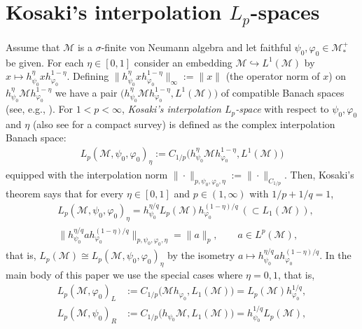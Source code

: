 \documentclass[12pt]{article}
\theoremstyle{definition}
\theoremstyle{remark}
\numberwithin{equation}{section}
\def\Me{\mathcal M}
\def\ffi{\varphi}
\begin{document}
\section{Kosaki's interpolation $L_p$-spaces}\label{Appen-Kosaki-Lp}

Assume that $\Me$ is a $\sigma$-finite von Neumann algebra and let faithful
$\psi_0,\ffi_0\in\Me_*^+$ be given. For each $\eta\in[0,1]$ consider an embedding
$\Me\hookrightarrow L^1(\Me)$ by $x\mapsto h_{\psi_0}^\eta xh_{\ffi_0}^{1-\eta}$. Defining
$\|h_{\psi_0}^\eta xh_{\ffi_0}^{1-\eta}\|_\infty:=\|x\|$ (the operator norm of $x$) on
$h_{\psi_0}^\eta\Me h_{\ffi_0}^{1-\eta}$ we have a pair
$\bigl(h_{\psi_0}^\eta\Me h_{\ffi_0}^{1-\eta},L^1(\Me)\bigr)$ of compatible Banach spaces (see, e.g.,
\cite{bergh1976interpolation}). For $1<p<\infty$, \emph{Kosaki's interpolation $L_p$-space}
with respect to $\psi_0,\ffi_0$ and $\eta$ \cite{kosaki1984applications} (also see
\cite[Sec.~9.3]{hiai2021lectures} for a compact survey) is defined as the complex interpolation
Banach space:
\begin{align}\label{F-C.1}
L_p(\Me,\psi_0,\ffi_0)_\eta:=C_{1/p}\bigl(h_{\psi_0}^\eta\Me h_{\ffi_0}^{1-\eta},L^1(\Me)\bigr)
\end{align}
equipped with the interpolation norm $\|\cdot\|_{p,\psi_0,\ffi_0,\eta}:=\|\cdot\|_{C_{1/p}}$. Then,
 Kosaki's theorem \cite[Theorem 9.1]{kosaki1984applications} says that for every $\eta\in[0,1]$ and
 $p\in(1,\infty)$ with $1/p+1/q=1$,
\begin{align*}
&L_p(\Me,\psi_0,\ffi_0)_\eta=h_{\psi_0}^{\eta/q}L_p(\Me)h_{\ffi_0}^{(1-\eta)/q}\ (\subset L_1(\Me)), \\
&\|h_{\psi_0}^{\eta/q}ah_{\ffi_0}^{(1-\eta)/q}\|_{p,\psi_0,\ffi_0,\eta}=\|a\|_p,\qquad a\in L^p(\Me),
\end{align*}
that is, $L_p(\Me)\cong L_p(\Me,\psi_0,\ffi_0)_\eta$ by the isometry
$a\mapsto h_{\psi_0}^{\eta/q}ah_{\ffi_0}^{(1-\eta)/q}$. {\color{red}In the main body of this paper we use the
special cases where $\eta=0,1$, that is,}
\begin{align}
L_p(\Me,\ffi_0)_L&:=C_{1/p}\bigl(\Me h_{\ffi_0},L_1(\Me)\bigr)=L_p(\Me)h_{\ffi_0}^{1/q},
\label{F-C.2}\\
L_p(\Me,\psi_0)_R&:=C_{1/p}\bigl(h_{\psi_0}\Me,L_1(\Me)\bigr)=h_{\psi_0}^{1/q}L_p(\Me),
\label{F-C.3}
\end{align}
\end{document}
